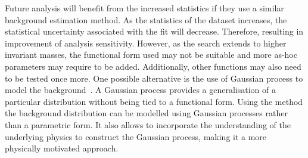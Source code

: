 Future analysis will benefit from the increased statistics if they use a similar background estimation method. As the statistics of the dataset increases, the statistical uncertainty associated with the fit will decrease. Therefore, resulting in improvement of analysis sensitivity. However, as the search extends to higher invariant masses, the functional form used may not be suitable and more as-hoc parameters may require to be added. Additionally, other functions may also need to be tested once more. One possible alternative is the use of Gaussian process to model the background~\cite{frate2017modeling}. A Gaussian process provides a generalisation of a particular distribution without being tied to a functional form. Using the method the background distribution can be modelled using Gaussian processes rather than a parametric form. It also allows to incorporate the understanding of the underlying physics to construct the Gaussian process, making it a more physically motivated approach. 


